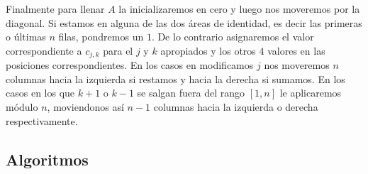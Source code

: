 Finalmente para llenar $A$ la inicializaremos en cero y luego nos moveremos por la diagonal. Si estamos en alguna de las dos \'areas de identidad, es decir las primeras o \'ultimas $n$ filas, pondremos un $1$. De lo contrario asignaremos el valor correspondiente a $c_{j,k}$ para el $j$ y $k$ apropiados y los otros $4$ valores en las posiciones correspondientes. En los casos en modificamos $j$ nos moveremos $n$ columnas hacia la izquierda si restamos y hacia la derecha si sumamos. En los casos en los que $k+1$ o $k-1$ se salgan fuera del rango $[1,n]$ le aplicaremos m\'odulo $n$, moviendonos as\'i $n-1$ columnas hacia la izquierda o derecha respectivamente.


\newpage
\subsection{Algoritmos}

